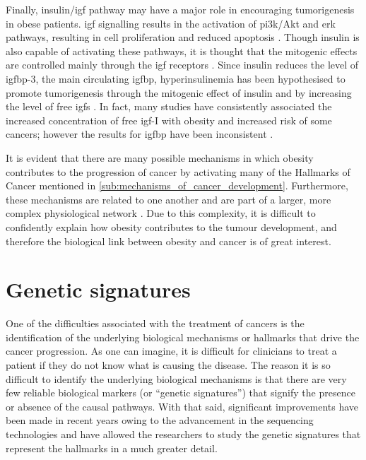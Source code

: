 Finally, insulin/\gls{igf} pathway may have a major role in encouraging tumorigenesis in obese patients.
\gls{igf} signalling results in the activation of \gls{pi3k}/Akt and \gls{erk} pathways, resulting in cell proliferation and reduced apoptosis \citep{Roberts2010}.
Though insulin is also capable of activating these pathways, it is thought that the mitogenic effects are controlled mainly through the \gls{igf} receptors \citep{Roberts2010}.
Since insulin reduces the level of \gls{igfbp}-3, the main circulating \gls{igfbp}, hyperinsulinemia has been hypothesised to promote tumorigenesis through the mitogenic effect of insulin and by increasing the level of free \glspl{igf} \citep{Giovannucci1995,Mckeown1994,Roberts2010}.
In fact, many studies have consistently associated the increased concentration of free \gls{igf}-I with obesity and increased risk of some cancers; however the results for \gls{igfbp} have been inconsistent \citep{Basen2011}.

It is evident that there are many possible mechanisms in which obesity contributes to the progression of cancer by activating many of the Hallmarks of Cancer mentioned in \cref{sub:mechanisms_of_cancer_development}.
Furthermore, these mechanisms are related to one another and are part of a larger, more complex physiological network \citep{Renehan2006}.
Due to this complexity, it is difficult to confidently explain how obesity contributes to the tumour development, and therefore the biological link between obesity and cancer is of great interest.

\section{Genetic signatures}
\label{sec:genetic_signatures}

One of the difficulties associated with the treatment of cancers is the identification of the underlying biological mechanisms or hallmarks that drive the cancer progression.
As one can imagine, it is difficult for clinicians to treat a patient if they do not know what is causing the disease.
The reason it is so difficult to identify the underlying biological mechanisms is that there are very few reliable biological markers (or ``genetic signatures'') that signify the presence or absence of the causal pathways.
With that said, significant improvements have been made in recent years owing to the advancement in the sequencing technologies and have allowed the researchers to study the genetic signatures that represent the hallmarks in a much greater detail.

